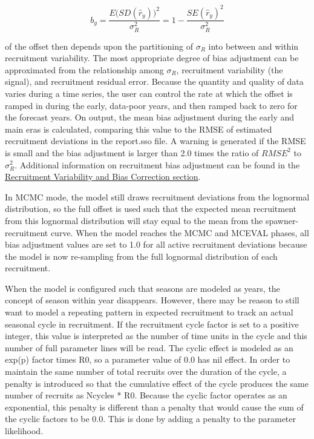 \begin{equation}
	b_y=\frac{E\Big( SD(\hat{r}_y)\Big)^2}{\sigma^2_R}=1-\frac{SE(\hat{r}_y)^2}{\sigma^2_R}
\end{equation}

\noindent of the offset then depends upon the partitioning of $\sigma_R$ into between and within recruitment variability.  The most appropriate degree of bias adjustment can be approximated from the relationship among $\sigma_R$, recruitment variability (the signal), and recruitment residual error. Because the quantity and quality of data varies during a time series, the user can control the rate at which the offset is ramped in during the early, data-poor years, and then ramped back to zero for the forecast years. On output, the mean bias adjustment during the early and main eras is calculated, comparing this value to the RMSE of estimated recruitment deviations in the report.sso file. A warning is generated if the RMSE is small and the bias adjustment is larger than 2.0 times the ratio of $RMSE^2$ to $\sigma^2_R$. Additional information on recruitment bias adjustment can be found in the \hyperlink{BiasCorrect}{Recruitment Variability and Bias Correction section}.

In MCMC mode, the model still draws recruitment deviations from the lognormal distribution, so the full offset is used such that the expected mean recruitment from this lognormal distribution will stay equal to the mean from the spawner-recruitment curve. When the model reaches the MCMC and MCEVAL phases, all bias adjustment values are set to 1.0 for all active recruitment deviations because the model is now re-sampling from the full lognormal distribution of each recruitment.

When the model is configured such that seasons are modeled as years, the concept of season within year disappears.  However, there may be reason to still want to model a repeating pattern in expected recruitment to track an actual seasonal cycle in recruitment.  If the recruitment cycle factor is set to a positive integer, this value is interpreted as the number of time units in the cycle and this number of full parameter lines will be read. The cyclic effect is modeled as an exp(p) factor times R0, so a parameter value of 0.0 has nil effect. In order to maintain the same number of total recruits over the duration of the cycle, a penalty is introduced so that the cumulative effect of the cycle produces the same number of recruits as Ncycles * R0. Because the cyclic factor operates as an exponential, this penalty is different than a penalty that would cause the sum of the cyclic factors to be 0.0.  This is done by adding a penalty to the parameter likelihood. %

